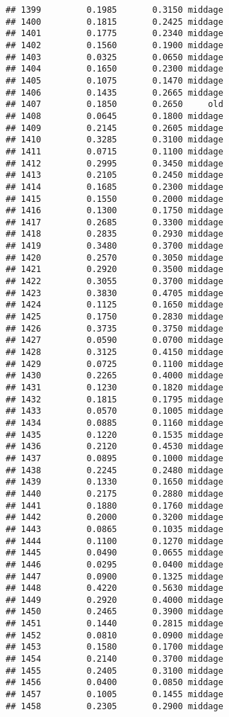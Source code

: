 \documentclass[
]{article}
\begin{document}
\begin{verbatim}
## 1399         0.1985       0.3150 middage
## 1400         0.1815       0.2425 middage
## 1401         0.1775       0.2340 middage
## 1402         0.1560       0.1900 middage
## 1403         0.0325       0.0650 middage
## 1404         0.1650       0.2300 middage
## 1405         0.1075       0.1470 middage
## 1406         0.1435       0.2665 middage
## 1407         0.1850       0.2650     old
## 1408         0.0645       0.1800 middage
## 1409         0.2145       0.2605 middage
## 1410         0.3285       0.3100 middage
## 1411         0.0715       0.1100 middage
## 1412         0.2995       0.3450 middage
## 1413         0.2105       0.2450 middage
## 1414         0.1685       0.2300 middage
## 1415         0.1550       0.2000 middage
## 1416         0.1300       0.1750 middage
## 1417         0.2685       0.3300 middage
## 1418         0.2835       0.2930 middage
## 1419         0.3480       0.3700 middage
## 1420         0.2570       0.3050 middage
## 1421         0.2920       0.3500 middage
## 1422         0.3055       0.3700 middage
## 1423         0.3830       0.4705 middage
## 1424         0.1125       0.1650 middage
## 1425         0.1750       0.2830 middage
## 1426         0.3735       0.3750 middage
## 1427         0.0590       0.0700 middage
## 1428         0.3125       0.4150 middage
## 1429         0.0725       0.1100 middage
## 1430         0.2265       0.4000 middage
## 1431         0.1230       0.1820 middage
## 1432         0.1815       0.1795 middage
## 1433         0.0570       0.1005 middage
## 1434         0.0885       0.1160 middage
## 1435         0.1220       0.1535 middage
## 1436         0.2120       0.4530 middage
## 1437         0.0895       0.1000 middage
## 1438         0.2245       0.2480 middage
## 1439         0.1330       0.1650 middage
## 1440         0.2175       0.2880 middage
## 1441         0.1880       0.1760 middage
## 1442         0.2000       0.3200 middage
## 1443         0.0865       0.1035 middage
## 1444         0.1100       0.1270 middage
## 1445         0.0490       0.0655 middage
## 1446         0.0295       0.0400 middage
## 1447         0.0900       0.1325 middage
## 1448         0.4220       0.5630 middage
## 1449         0.2920       0.4000 middage
## 1450         0.2465       0.3900 middage
## 1451         0.1440       0.2815 middage
## 1452         0.0810       0.0900 middage
## 1453         0.1580       0.1700 middage
## 1454         0.2140       0.3700 middage
## 1455         0.2405       0.3100 middage
## 1456         0.0400       0.0850 middage
## 1457         0.1005       0.1455 middage
## 1458         0.2305       0.2900 middage

\end{verbatim}
\end{document}
